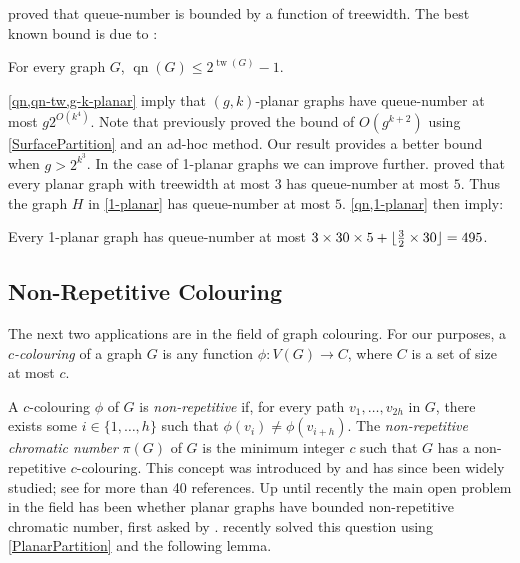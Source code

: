 \documentclass{patmorin}
\DeclareMathOperator{\tw}{tw}
\DeclareMathOperator{\qn}{qn}
\DeclarePairedDelimiter{\floor}{\lfloor}{\rfloor}
\renewcommand{\le}{\leqslant}
\renewcommand{\geq}{\geqslant}
\begin{document}
\citet{dujmovic.morin.ea:layered} proved that queue-number is bounded by a function of treewidth. 
The best known bound is due to \citet{wiechert:on}:

\begin{thm}
\label{qn-tw}
    For every graph $G$, $\qn(G)\le 2^{\tw(G)}-1$.
\end{thm}

\cref{qn,qn-tw,g-k-planar} imply that $(g,k)$-planar graphs have queue-number at most $g 2^{O(k^4)}$. 
Note that \citet{dujmovic.joret.ea:planar} previously proved the bound of 
$O(g^{k+2})$ using \cref{SurfacePartition} and an ad-hoc method. Our result provides a better bound when $g>2^{k^3}$. 
%
%
In the case of 1-planar graphs we can improve further. \citet{ABGKP18} proved that every planar graph with treewidth at most $3$ has queue-number at most $5$. Thus the graph $H$ in \cref{1-planar} has queue-number at most $5$. \cref{qn,1-planar} then imply:

\begin{prop}
Every 1-planar graph has queue-number at most $3 \times 30 \times 5 + \floor{\tfrac{3}{2} \times 30} = 495$. \end{prop}


\subsection{Non-Repetitive Colouring}

The next two applications are in the field of graph colouring. For our purposes, a \emph{$c$-colouring} of a graph $G$ is any function $\phi\colon V(G)\to C$, where $C$ is a set of size at most $c$.

A $c$-colouring $\phi$ of $G$ is \emph{non-repetitive} if, for every path $v_1,\ldots,v_{2h}$ in $G$, there exists some $i\in\{1,\ldots,h\}$ such that $\phi(v_i)\neq\phi(v_{i+h})$.  The \emph{non-repetitive chromatic number} $\pi(G)$ of $G$ is the minimum integer $c$ such that $G$ has a non-repetitive $c$-colouring. This concept was introduced by \citet{AGHR-RSA02} and has since been widely studied; see \citep{dujmovic.esperet.ea:planar} for more than 40 references. Up until recently the main open problem in the field has been whether planar graphs have bounded non-repetitive chromatic number, first asked by \citet{AGHR-RSA02}. \citet{dujmovic.esperet.ea:planar} recently solved this question using \cref{PlanarPartition} and the following lemma.
\end{document}
